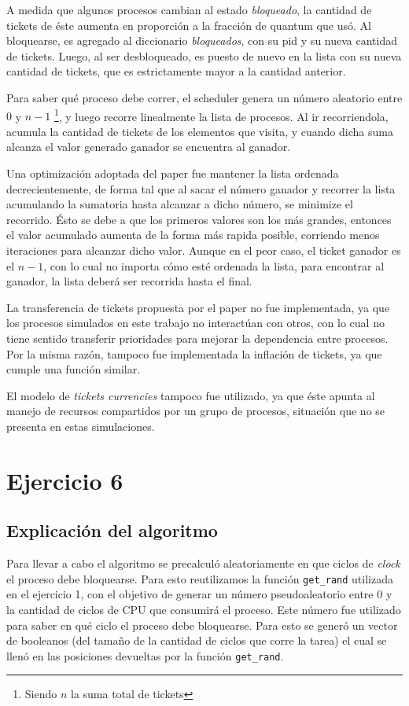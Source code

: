 \documentclass[a4paper]{article}
\begin{document}
A medida que algunos procesos cambian al estado \textit{bloqueado}, la
cantidad de tickets de éste aumenta en proporción a la fracción de quantum que usó. Al
bloquearse, es agregado al diccionario \textit{bloqueados}, con su pid y
su nueva cantidad de tickets. Luego, al ser desbloqueado, es puesto de nuevo
en la lista con su nueva cantidad de tickets, que es estrictamente mayor a
la cantidad anterior.

Para saber qué proceso debe correr, el scheduler genera un número
aleatorio entre $0$ y $n-1$ \footnote{Siendo $n$ la suma total de tickets}, y luego recorre linealmente la lista de
procesos. Al ir recorriendola, acumula la cantidad de tickets de los
elementos que visita, y cuando dicha suma alcanza el valor generado
ganador se encuentra al ganador.

Una optimización adoptada del paper fue mantener la lista ordenada
decrecientemente, de forma tal que al sacar el número ganador y recorrer la
lista acumulando la sumatoria hasta alcanzar a dicho número, se minimize el
recorrido. Ésto se debe a que los primeros valores son los más grandes,
entonces el valor acumulado aumenta de la forma más rapida posible,
corriendo menos iteraciones para alcanzar dicho valor. Aunque en el peor
caso, el ticket ganador es el $n-1$, con lo cual no importa cómo esté
ordenada la lista, para encontrar al ganador, la lista deberá ser recorrida
hasta el final.

La transferencia de tickets propuesta por el paper no fue implementada, ya que
los procesos simulados en este trabajo no interactúan con otros, con lo cual
no tiene sentido transferir prioridades para mejorar la dependencia entre
procesos. Por la misma razón, tampoco fue implementada la inflación de
tickets, ya que cumple una función similar.

El modelo de \textit{tickets currencies} tampoco fue utilizado, ya que
éste apunta al manejo de recursos compartidos por un grupo de procesos,
situación que no se presenta en estas simulaciones.

\section{Ejercicio 6}

\subsection{Explicación del algoritmo}
Para llevar a cabo el algoritmo se precalculó aleatoriamente en que ciclos
de \textit{clock} el proceso debe bloquearse. Para esto reutilizamos la
función \verb|get_rand| utilizada en el ejercicio 1, con el objetivo de
generar un número pseudoaleatorio entre 0 y la cantidad de ciclos de CPU que
consumirá el proceso. Este número fue utilizado para saber en qué ciclo el
proceso debe bloquearse. Para esto se generó un vector de booleanos (del
tamaño de la cantidad de ciclos que corre la tarea) el cual se llenó en las
posiciones devueltas por la función \verb|get_rand|.
\end{document}

